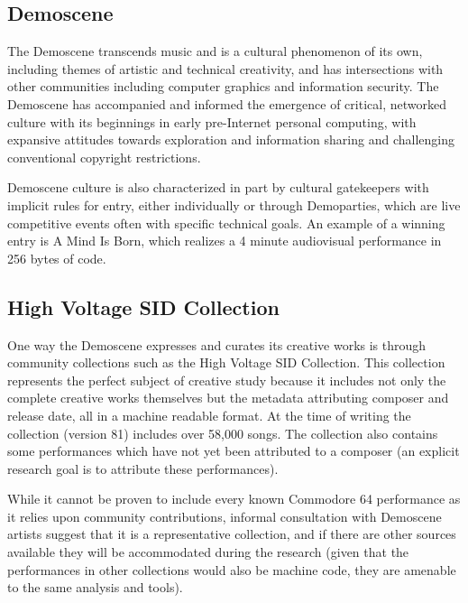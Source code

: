 \documentclass[10pt]{article}
\begin{document}
\begin{multicols*}{2}
\subsection{Demoscene}

The Demoscene transcends music and is a cultural phenomenon of its own\cite{hackingpractices}, including themes of artistic and technical creativity, and has intersections with other communities including computer graphics\cite{siggraphdemo} and information security\cite{layerone}. The Demoscene has accompanied and informed the emergence of critical, networked culture with its beginnings in early pre-Internet personal computing\cite{pioneers}, with expansive attitudes towards exploration and information sharing and challenging conventional copyright restrictions.

Demoscene culture is also characterized in part by cultural gatekeepers with implicit rules for entry\cite{gatekeepers}, either individually or through Demoparties\cite{assembly}, which are live competitive events often with specific technical goals. An example of a winning entry is A Mind Is Born\cite{amib}, which realizes a 4 minute audiovisual performance in 256 bytes of code.

\subsection{High Voltage SID Collection}
\label{hvsc}

One way the Demoscene expresses and curates its creative works is through community collections such as the High Voltage SID Collection\cite{hvsc}. This collection represents the perfect subject of creative study because it includes not only the complete creative works themselves but the metadata attributing composer and release date, all in a machine readable format. At the time of writing the collection (version 81) includes over 58,000 songs. The collection also contains some performances which have not yet been attributed to a composer (an explicit research goal is to attribute these performances).

While it cannot be proven to include every known Commodore 64 performance as it relies upon community contributions, informal consultation with Demoscene artists suggest that it is a representative collection, and if there are other sources available they will be accommodated during the research (given that the performances in other collections would also be machine code, they are amenable to the same analysis and tools).


\end{multicols*}
\end{document}
